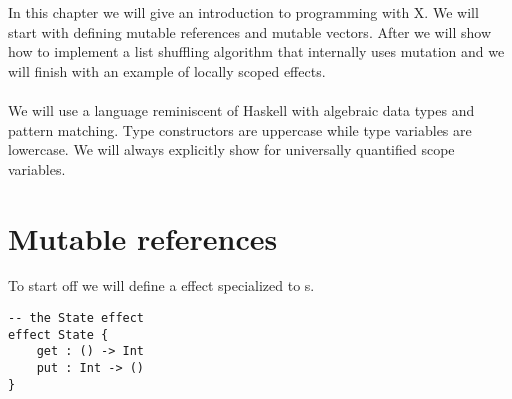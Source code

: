 \iffalse
\fi

In this chapter we will give an introduction to programming with X. We will start with defining mutable references and mutable vectors. After we will show how to implement a list shuffling algorithm that internally uses mutation and we will finish with an example of locally scoped effects.
\\\\
We will use a language reminiscent of Haskell with algebraic data types and pattern matching.
Type constructors are uppercase while type variables are lowercase.
We will always explicitly show  for universally quantified scope variables.

\section{Mutable references}
To start off we will define a  effect specialized to s.
\begin{verbatim}
-- the State effect
effect State {
	get : () -> Int
	put : Int -> ()
}
\end{verbatim}

